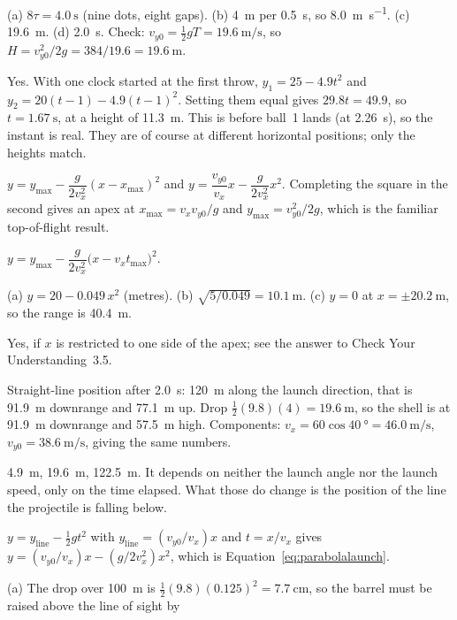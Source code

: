 \documentclass[11pt,twoside,openany]{book}
\begin{document}
\begin{description}[leftmargin=2.6em,itemsep=3pt,style=sameline]
  \item[3.20] (a) $8\tau = \SI{4.0}{\second}$ (nine dots, eight gaps). (b) \SI{4}{\metre} per \SI{0.5}{\second}, so \SI{8.0}{\metre\per\second}. (c) \SI{19.6}{\metre}. (d) \SI{2.0}{\second}. Check: $v_{y0} = \tfrac12 gT = \SI{19.6}{\metre\per\second}$, so $H = v_{y0}^2/2g = 384/19.6 = \SI{19.6}{\metre}$.
  \item[3.21] Yes. With one clock started at the first throw, $y_1 = 25 - 4.9t^2$ and $y_2 = 20(t-1) - 4.9(t-1)^2$. Setting them equal gives $29.8t = 49.9$, so $t = \SI{1.67}{\second}$, at a height of \SI{11.3}{\metre}. This is before ball~1 lands (at \SI{2.26}{\second}), so the instant is real. They are of course at different horizontal positions; only the heights match.
  \item[3.22] $y = y_{\max} - \dfrac{g}{2v_x^2}(x-x_{\max})^2$ and $y = \dfrac{v_{y0}}{v_x}x - \dfrac{g}{2v_x^2}x^2$. Completing the square in the second gives an apex at $x_{\max} = v_xv_{y0}/g$ and $y_{\max} = v_{y0}^2/2g$, which is the familiar top-of-flight result.
  \item[3.23] $y = y_{\max} - \dfrac{g}{2v_x^2}\big(x - v_xt_{\max}\big)^2$.
  \item[3.24] (a) $y = 20 - 0.049\,x^2$ (metres). (b) $\sqrt{5/0.049} = \SI{10.1}{\metre}$. (c) $y = 0$ at $x = \pm\SI{20.2}{\metre}$, so the range is \SI{40.4}{\metre}.
  \item[3.25] Yes, if $x$ is restricted to one side of the apex; see the answer to Check Your Understanding~3.5.
  \item[3.26] Straight-line position after \SI{2.0}{\second}: \SI{120}{\metre} along the launch direction, that is \SI{91.9}{\metre} downrange and \SI{77.1}{\metre} up. Drop $\tfrac12(9.8)(4) = \SI{19.6}{\metre}$, so the shell is at \SI{91.9}{\metre} downrange and \SI{57.5}{\metre} high. Components: $v_x = 60\cos\SI{40}{\degree} = \SI{46.0}{\metre\per\second}$, $v_{y0} = \SI{38.6}{\metre\per\second}$, giving the same numbers.
  \item[3.27] \SI{4.9}{\metre}, \SI{19.6}{\metre}, \SI{122.5}{\metre}. It depends on neither the launch angle nor the launch speed, only on the time elapsed. What those do change is the position of the line the projectile is falling below.
  \item[3.28] $y = y_{\text{line}} - \tfrac12 gt^2$ with $y_{\text{line}} = (v_{y0}/v_x)x$ and $t = x/v_x$ gives $y = (v_{y0}/v_x)x - (g/2v_x^2)x^2$, which is Equation~\eqref{eq:parabolalaunch}.
  \item[3.29] (a) The drop over \SI{100}{\metre} is $\tfrac12(9.8)(0.125)^2 = \SI{7.7}{\centi\metre}$, so the barrel must be raised above the line of sight by

\end{description}
\end{document}
